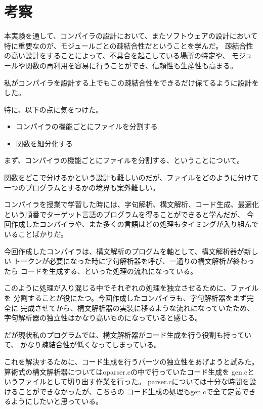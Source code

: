 \documentclass[11pt,a4j]{jarticle}
\begin{document}

\section{考察}

本実験を通して、コンパイラの設計において、またソフトウェアの設計において
特に重要なのが、モジュールごとの疎結合性だということを学んだ。
疎結合性の高い設計をすることによって、不具合を起こしている場所の特定や、
モジュールや関数の再利用を容易に行うことができ、信頼性も生産性も高まる。

私がコンパイラを設計する上でもこの疎結合性をできるだけ保てるように設計をした。

特に、以下の点に気をつけた。

\begin{itemize}
    \item コンパイラの機能ごとにファイルを分割する
    \item 関数を細分化する
\end{itemize}


まず、コンパイラの機能ごとにファイルを分割する、ということについて。

関数をどこで分けるかという設計も難しいのだが、ファイルをどのように分けて
一つのプログラムとするかの境界も案外難しい。

コンパイラを授業で学習した時には、字句解析、構文解析、コード生成、最適化
という順番でターゲット言語のプログラムを得ることができると学んだが、
今回作成したコンパイラや、また多くの言語はどの処理もタイミングが入り組んで
いることばかりだ。

今回作成したコンパイラは、構文解析のプログムを軸として、構文解析器が新しい
トークンが必要になった時に字句解析器を呼び、一通りの構文解析が終わったら
コードを生成する、といった処理の流れになっている。

このように処理が入り混じる中でそれぞれの処理を独立させるために、ファイルを
分割することが役にたつ。今回作成したコンパイラも、字句解析器をまず完全に
完成させてから、構文解析器の実装に移るような流れになっていたため、
字句解析器の独立性はかなり高いものになっていると感じる。

だが現状私のプログラムでは、構文解析器がコード生成を行う役割も持っていて、
かなり疎結合性が低くなってしまっている。

これを解決するために、コード生成を行うパーツの独立性をあげようと試みた。
算術式の構文解析器についてはoparser.cの中で行っていたコード生成を
gen.cというファイルとして切り出す作業を行った。
parser.cについては十分な時間を設けることができなかったが、こちらの
コード生成の処理もgen.cで全て定義できるようにしたいと思っている。
\end{document}
